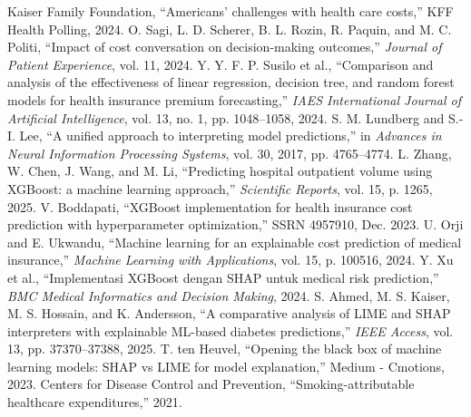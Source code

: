 \documentclass[conference]{IEEEtran}
\begin{document}
\begin{thebibliography}{00}
 Kaiser Family Foundation, ``Americans' challenges with health care costs,'' KFF Health Polling, 2024.
 O. Sagi, L. D. Scherer, B. L. Rozin, R. Paquin, and M. C. Politi, ``Impact of cost conversation on decision-making outcomes,'' \textit{Journal of Patient Experience}, vol. 11, 2024.
 Y. Y. F. P. Susilo et al., ``Comparison and analysis of the effectiveness of linear regression, decision tree, and random forest models for health insurance premium forecasting,'' \textit{IAES International Journal of Artificial Intelligence}, vol. 13, no. 1, pp. 1048--1058, 2024.
 S. M. Lundberg and S.-I. Lee, ``A unified approach to interpreting model predictions,'' in \textit{Advances in Neural Information Processing Systems}, vol. 30, 2017, pp. 4765--4774.
 L. Zhang, W. Chen, J. Wang, and M. Li, ``Predicting hospital outpatient volume using XGBoost: a machine learning approach,'' \textit{Scientific Reports}, vol. 15, p. 1265, 2025.
 V. Boddapati, ``XGBoost implementation for health insurance cost prediction with hyperparameter optimization,'' SSRN 4957910, Dec. 2023.
 U. Orji and E. Ukwandu, ``Machine learning for an explainable cost prediction of medical insurance,'' \textit{Machine Learning with Applications}, vol. 15, p. 100516, 2024.
 Y. Xu et al., ``Implementasi XGBoost dengan SHAP untuk medical risk prediction,'' \textit{BMC Medical Informatics and Decision Making}, 2024.
 S. Ahmed, M. S. Kaiser, M. S. Hossain, and K. Andersson, ``A comparative analysis of LIME and SHAP interpreters with explainable ML-based diabetes predictions,'' \textit{IEEE Access}, vol. 13, pp. 37370--37388, 2025.
 T. ten Heuvel, ``Opening the black box of machine learning models: SHAP vs LIME for model explanation,'' Medium - Cmotions, 2023.
 Centers for Disease Control and Prevention, ``Smoking-attributable healthcare expenditures,'' 2021.
\end{thebibliography}
\end{document}
